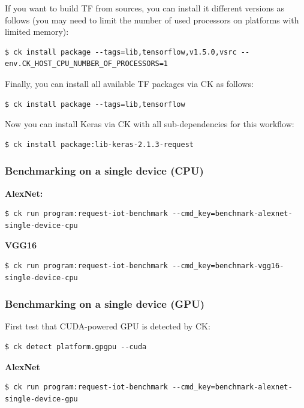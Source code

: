 \documentclass[sigplan]{acmart}
\begin{document}
If you want to build TF from sources, you can install it different versions as follows
(you may need to limit the number of used processors on platforms with limited memory):
\begin{verbatim}
$ ck install package --tags=lib,tensorflow,v1.5.0,vsrc --env.CK_HOST_CPU_NUMBER_OF_PROCESSORS=1
\end{verbatim}

Finally, you can install all available TF packages via CK as follows:

\begin{verbatim}
$ ck install package --tags=lib,tensorflow
\end{verbatim}

Now you can install Keras via CK with all sub-dependencies for this workflow:
\begin{verbatim}
$ ck install package:lib-keras-2.1.3-request
\end{verbatim}

\subsubsection{Benchmarking on a single device (CPU)}

\textbf{AlexNet:}

\begin{verbatim}
$ ck run program:request-iot-benchmark --cmd_key=benchmark-alexnet-single-device-cpu 
\end{verbatim}

\textbf{VGG16}

\begin{verbatim}
$ ck run program:request-iot-benchmark --cmd_key=benchmark-vgg16-single-device-cpu
\end{verbatim}
\subsubsection{Benchmarking on a single device (GPU)}

First test that CUDA-powered GPU is detected by CK:

\begin{verbatim}$ ck detect platform.gpgpu --cuda\end{verbatim}

\textbf{AlexNet}

\begin{verbatim}
$ ck run program:request-iot-benchmark --cmd_key=benchmark-alexnet-single-device-gpu 
\end{verbatim}
\end{document}

